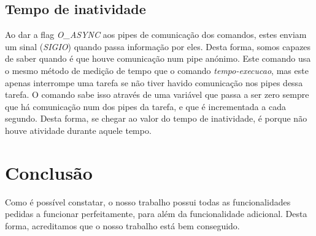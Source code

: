 \documentclass[a4paper]{report}
\begin{document}
	\section{Tempo de inatividade}
	Ao dar a flag \emph{O_ASYNC} aos pipes de comunicação dos comandos, estes enviam um sinal (\emph{SIGIO}) quando passa informação por eles. Desta forma, somos capazes de saber quando é que houve comunicação num pipe anónimo. Este comando usa o mesmo método de medição de tempo que o comando \emph{tempo-execucao}, mas este apenas interrompe uma tarefa se não tiver havido comunicação nos pipes dessa tarefa. O comando sabe isso através de uma variável que passa a ser zero sempre que há comunicação num dos pipes da tarefa, e que é incrementada a cada segundo. Desta forma, se chegar ao valor do tempo de inatividade, é porque não houve atividade durante aquele tempo.
		
	

	\chapter{Conclusão}
	
	Como é possível constatar, o nosso trabalho possui todas as funcionalidades pedidas a funcionar perfeitamente, para além da funcionalidade adicional. Desta forma, acreditamos que o nosso trabalho está bem conseguido.
\end{document}
